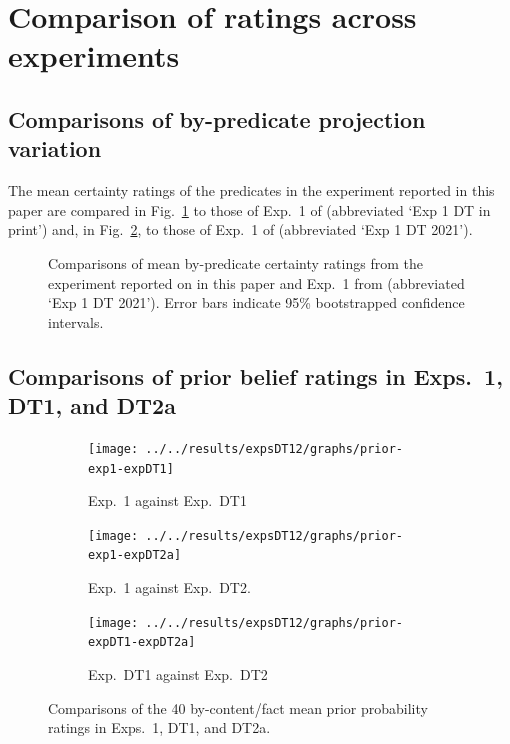 \documentclass[11pt,fleqn]{article}
\newcommand{\6}{\mbox{$[\hspace*{-.6mm}[$}}
\newcommand{\9}{\mbox{$]\hspace*{-.6mm}]$}}
\begin{document}
\newpage

\section{Comparison of ratings across experiments}

\subsection{Comparisons of by-predicate projection variation}\label{a-replication}

The mean certainty ratings of the predicates in the experiment reported  in this paper are compared in Fig.~\ref{fig:comparison-language} to those of Exp.~1 of \citealt{degen-tonhauser-language} (abbreviated `Exp 1 DT in print') and, in Fig.~\ref{fig:comparison-openmind}, to those of  Exp.~1 of \citealt{degen-tonhauser-openmind} (abbreviated `Exp 1 DT 2021'). 

\begin{figure}[h!]
\centering
\begin{subfigure}[t]{0.5\textwidth}
        \centering
\caption{}\label{fig:comparison-language}
 \end{subfigure}%
\begin{subfigure}[t]{0.5\textwidth}
\centering
\caption{}\label{fig:comparison-openmind}
\end{subfigure}
\caption{Comparisons of mean by-predicate certainty ratings from the experiment reported on in this paper and Exp.~1 from \citealt{degen-tonhauser-openmind} (abbreviated `Exp 1 DT 2021'). Error bars indicate 95\% bootstrapped confidence intervals.} 
\label{f-comparison}
\end{figure}

\subsection{Comparisons of prior belief ratings in Exps.~1, DT1, and DT2a}\label{a-beliefs-corr-prior}

\begin{figure}[h!]
\centering
\begin{subfigure}[t]{.3\textwidth}
\centering
\texttt{[image: ../../results/expsDT12/graphs/prior-exp1-expDT1]}
\caption{Exp.~1 against Exp.~DT1}\label{fig:prior-exp1-expDT1}
\end{subfigure} \hfill \begin{subfigure}[t]{.3\textwidth}
\centering
\texttt{[image: ../../results/expsDT12/graphs/prior-exp1-expDT2a]}
\caption{Exp.~1 against Exp.~DT2.}\label{fig:prior-exp1-expDT2a}
 \end{subfigure} \hfill \begin{subfigure}[t]{.3\textwidth}
\centering
\texttt{[image: ../../results/expsDT12/graphs/prior-expDT1-expDT2a]}
\caption{Exp.~DT1 against Exp.~DT2}\label{fig:prior-expDT1-expDT2a}
 \end{subfigure}
\caption{Comparisons of the 40 by-content/fact mean prior probability ratings in Exps.~1, DT1, and DT2a.}
\end{figure}
\end{document}
